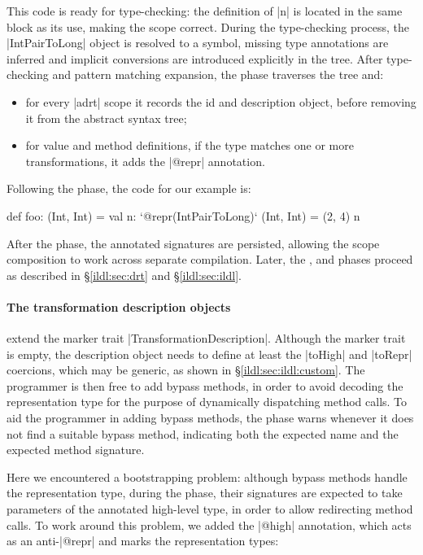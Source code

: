 This code is ready for type-checking: the definition of |n| is located in the same block as its use, making the scope correct. During the type-checking process, the |IntPairToLong| object is resolved to a symbol, missing type annotations are inferred and implicit conversions are introduced explicitly in the tree. After type-checking and pattern matching expansion, the \inject{} phase traverses the tree and:


\begin{itemize}
\item for every |adrt| scope it records the id and description object, before removing it from the abstract syntax tree;
\item for value and method definitions, if the type matches one or more transformations, it adds the |@repr| annotation.
\end{itemize}


\noindent Following the \inject{} phase, the code for our example is:

\begin{lstlisting-nobreak}
def foo: (Int, Int) = {
  val n: `@repr(IntPairToLong)` (Int, Int) = (2, 4)
  n
}
\end{lstlisting-nobreak}

\noindent
After the \inject{} phase, the annotated signatures are persisted, allowing the scope composition to work across separate compilation.
Later, the \bridge{}, \coerce{} and \commit{} phases proceed as described in \S\ref{ildl:sec:drt} and \S\ref{ildl:sec:ildl}.

\paragraph*{The transformation description objects} extend the marker trait |TransformationDescription|. Although the marker trait is empty, the description object needs to define at least the |toHigh| and |toRepr| coercions, which may be generic, as shown in \S\ref{ildl:sec:ildl:custom}. The programmer is then free to add bypass methods, in order to avoid decoding the representation type for the purpose of dynamically dispatching method calls. To aid the programmer in adding bypass methods, the \coerce{} phase warns whenever it does not find a suitable bypass method, indicating both the expected name and the expected method signature. 

Here we encountered a bootstrapping problem: although bypass methods handle the representation type, during the \coerce{} phase, their signatures are expected to take parameters of the annotated high-level type, in order to allow redirecting method calls. To work around this problem, we added the |@high| annotation, which acts as an anti-|@repr| and marks the representation types:

